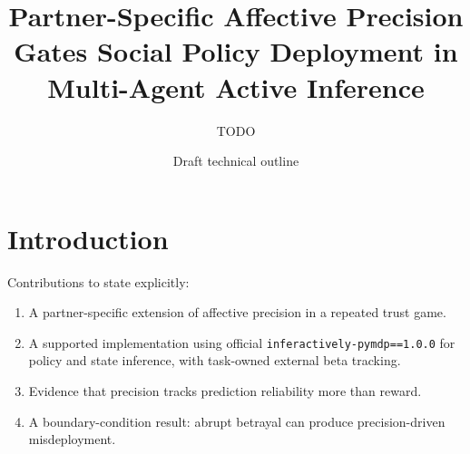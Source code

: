 \documentclass[11pt]{article}
\title{Partner-Specific Affective Precision Gates Social Policy Deployment in Multi-Agent Active Inference}
\author{TODO}
\date{Draft technical outline}
\begin{document}
\maketitle

\begin{abstract}
\end{abstract}

\section{Introduction}


Contributions to state explicitly:
\begin{enumerate}
  \item A partner-specific extension of affective precision in a repeated trust game.
  \item A supported implementation using official \texttt{inferactively-pymdp==1.0.0} for policy and state inference, with task-owned external beta tracking.
  \item Evidence that precision tracks prediction reliability more than reward.
  \item A boundary-condition result: abrupt betrayal can produce precision-driven misdeployment.
\end{enumerate}
\end{document}
